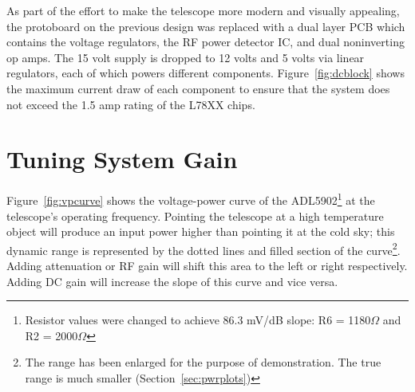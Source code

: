 \documentclass[titlepage]{article}
\begin{document}
As part of the effort to make the telescope more modern and visually appealing, the protoboard on the previous design was replaced with a dual layer PCB which contains the voltage regulators, the RF power detector IC, and dual noninverting op amps. The 15 volt supply is dropped to 12 volts and 5 volts via linear regulators, each of which powers different components. Figure~\ref{fig:dcblock} shows the maximum current draw of each component to ensure that the system does not exceed the 1.5 amp rating of the L78XX chips.


\section{Tuning System Gain}
\label{sec:tuning}
Figure~\ref{fig:vpcurve} shows the voltage-power curve of the ADL5902\footnote{Resistor values were changed to achieve 86.3 mV/dB slope: R6 = 1180$\Omega$ and R2 = 2000$\Omega$} at the telescope's operating frequency. Pointing the telescope at a high temperature object will produce an input power higher than pointing it at the cold sky; this dynamic range is represented by the dotted lines and filled section of the curve\footnote{The range has been enlarged for the purpose of demonstration. The true range is much smaller (Section~\ref{sec:pwrplots})}. Adding attenuation or RF gain will shift this area to the left or right respectively. Adding DC gain will increase the slope of this curve and vice versa.
\end{document}
